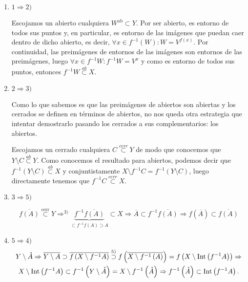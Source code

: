 \begin{demo}
\begin{enumerate}
    \item $1 \Rightarrow 2)$
    
    Escojamos un abierto cualquiera $W^{\text{ab}} \subset Y$. Por ser abierto, es entorno de todos sus puntos y, en particular, es entorno de las imágenes que puedan caer dentro de dicho abierto, es decir, $\forall x \in f^{-1} (W) : W = V^{f(x)}$. Por continuidad, las preimágenes de entornos de las imágenes son entornos de las preimágenes, luego $\forall x \in f^{-1} W : f^{-1}W = V^x$ y como es entorno de todos sus puntos, entonces $f^{-1} W \stackrel{ab}{\subset} X$.
    \item $2 \Rightarrow 3)$
    
    Como lo que sabemos es que las preimágenes de abiertos son abiertas y los cerrados se definen en términos de abiertos, no nos queda otra estrategia que intentar demostrarlo pasando los cerrados a sus complementarios: los abiertos.
    
    Escojamos un cerrado cualquiera $C \stackrel{cerr}{\subset} Y$ de modo que conocemos que $Y \setminus C \stackrel{ab}{\subset} Y$. Como conocemos el resultado para abiertos, podemos decir que $f^{-1}\left( Y\setminus C \right) \stackrel{ab}{\subset} X$ y conjuntistamente $X \setminus f^{-1}C = f^{-1}\left( Y\setminus C \right)$, luego directamente tenemos que $f^{-1}C \stackrel{cerr}{\subset} X$. 
    \item $3 \Rightarrow 5)$

    \[
        \overline{f\left( A \right)} \stackrel{\text{cerr}}{\subset} Y \Rightarrow^{3)} \underbrace{f^{-1}\overline{f\left( A \right)}}_{\subset f^{-1}f\left( A \right) \supset A} \subset X \Rightarrow \overline{A} \subset f^{-1}\overline{f\left( A \right)} \Rightarrow f\left( \overline{A} \right) \subset \overline{f\left( A \right)} 
    \]
    \item $5 \Rightarrow 4)$
    \begin{gather*}
        Y \setminus \mathring{A}\Rightarrow \overline{Y\setminus A} \supset \overline{f\left( X \setminus f^{-1}A \right)} \stackrel{5)}{\supset} f\left( \overline{X \setminus f^{-1}\left( A \right)} \right) = f\left( X \setminus \operatorname{Int}\left( f^{-1}A \right) \right) \Rightarrow\\
        X \setminus \operatorname{Int}\left( f^{-1}A \right) \subset f^{-1}\left( Y\setminus \mathring{A} \right) = X \setminus f^{-1}\left( \mathring{A} \right)\Rightarrow f^{-1}\left( \mathring{A} \right) \subset \operatorname{Int}\left( f^{-1}A \right) 
    .\end{gather*}


\end{enumerate}
\end{demo}
